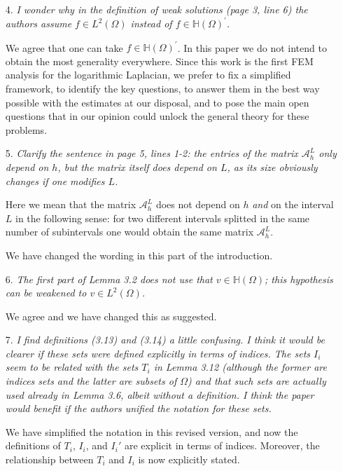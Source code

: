 \documentclass[11 pt]{article}
\numberwithin{equation}{section}
\begin{document}
\begin{enumerate}
    \item[4.] \emph{I wonder why in the definition of weak solutions (page 3, line 6) the authors assume \(f\in L^{2}(\Omega)\) instead of \(f\in\mathbb{H}(\Omega)^{\prime}\).}

    We agree that one can take \(f\in\mathbb{H}(\Omega)^{\prime}\). In this paper we do not intend to obtain the most generality everywhere. Since this work is the first FEM analysis for the logarithmic Laplacian, we prefer to fix a simplified framework, to identify the key questions, to answer them in the best way possible with the estimates at our disposal, and to pose the main open questions that in our opinion could unlock the general theory for these problems.

    \item[5.] \emph{Clarify the sentence in page 5, lines 1-2: the entries of the matrix \({\mathcal{A}}_{h}^{L}\) only depend on \(h\), but the matrix itself does depend on \(L\), as its size obviously changes if one modifies \(L\).}

    Here we mean that the matrix \({\mathcal{A}}_{h}^{L}\) does not depend on $h$ \emph{and} on the interval $L$ in the following sense: for two different intervals splitted in the same number of subintervals one would obtain the same matrix \({\mathcal{A}}_{h}^{L}\).

    We have changed the wording in this part of the introduction.

    \item[6.] \emph{The first part of Lemma 3.2 does not use that \(v\in\mathbb{H}(\Omega)\); this hypothesis can be weakened to \(v\in L^{2}(\Omega)\).}

    We agree and we have changed this as suggested.

    \item[7.] \emph{I find definitions (3.13) and (3.14) a little confusing. I think it would be clearer if these sets were defined explicitly in terms of indices. The sets \(I_{i}\) seem to be related with the sets \(T_{i}\) in Lemma 3.12 (although the former are indices sets and the latter are subsets of \(\Omega\)) and that such sets are actually used already in Lemma 3.6, albeit without a definition. I think the paper would benefit if the authors unified the notation for these sets.}

    We have simplified the notation in this revised version, and now the definitions of $T_i$, $I_i$, and $I_i'$ are explicit in terms of indices.  Moreover, the relationship between $T_i$ and $I_i$ is now explicitly stated.


\end{enumerate}
\end{document}
